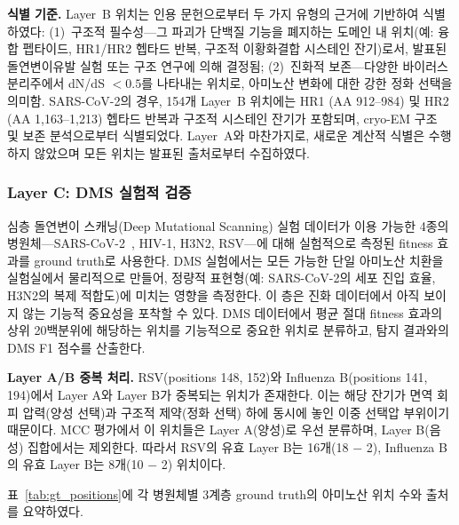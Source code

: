 \textbf{식별 기준.}
Layer~B 위치는 인용 문헌으로부터 두 가지 유형의 근거에 기반하여 식별하였다: (1)~구조적 필수성---그 파괴가 단백질 기능을 폐지하는 도메인 내 위치(예: 융합 펩타이드, HR1/HR2 헵타드 반복, 구조적 이황화결합 시스테인 잔기)로서, 발표된 돌연변이유발 실험 또는 구조 연구에 의해 결정됨; (2)~진화적 보존---다양한 바이러스 분리주에서 dN/dS $< 0.5$를 나타내는 위치로, 아미노산 변화에 대한 강한 정화 선택을 의미함.
SARS-CoV-2의 경우, 154개 Layer~B 위치에는 HR1 (AA 912--984) 및 HR2 (AA 1,163--1,213) 헵타드 반복과 구조적 시스테인 잔기가 포함되며, cryo-EM 구조~\cite{wrapp2020cryo} 및 보존 분석으로부터 식별되었다.
Layer~A와 마찬가지로, 새로운 계산적 식별은 수행하지 않았으며 모든 위치는 발표된 출처로부터 수집하였다.

\subsubsection{Layer C: DMS 실험적 검증}

심층 돌연변이 스캐닝(Deep Mutational Scanning) 실험 데이터가 이용 가능한 4종의 병원체---SARS-CoV-2~\cite{dadonaite2023dms}, HIV-1, H3N2, RSV---에 대해 실험적으로 측정된 fitness 효과를 ground truth로 사용한다.
DMS 실험에서는 모든 가능한 단일 아미노산 치환을 실험실에서 물리적으로 만들어, 정량적 표현형(예: SARS-CoV-2의 세포 진입 효율, H3N2의 복제 적합도)에 미치는 영향을 측정한다. 이 층은 진화 데이터에서 아직 보이지 않는 기능적 중요성을 포착할 수 있다.
DMS 데이터에서 평균 절대 fitness 효과의 상위 20백분위에 해당하는 위치를 기능적으로 중요한 위치로 분류하고, 탐지 결과와의 DMS F1 점수를 산출한다.

\textbf{Layer A/B 중복 처리.}
RSV(positions 148, 152)와 Influenza B(positions 141, 194)에서 Layer A와 Layer B가 중복되는 위치가 존재한다.
이는 해당 잔기가 면역 회피 압력(양성 선택)과 구조적 제약(정화 선택) 하에 동시에 놓인 이중 선택압 부위이기 때문이다.
MCC 평가에서 이 위치들은 Layer A(양성)로 우선 분류하며, Layer B(음성) 집합에서는 제외한다.
따라서 RSV의 유효 Layer B는 16개(18 $-$ 2), Influenza B의 유효 Layer B는 8개(10 $-$ 2) 위치이다.

표~\ref{tab:gt_positions}에 각 병원체별 3계층 ground truth의 아미노산 위치 수와 출처를 요약하였다.

